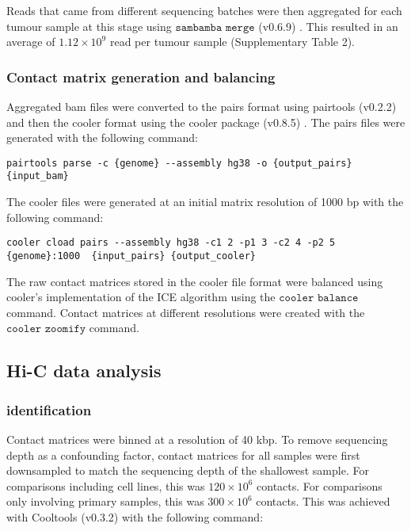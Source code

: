 Reads that came from different sequencing batches were then aggregated for each tumour sample at this stage using $\texttt{sambamba merge}$ (v0.6.9) \cite{tarasovSambambaFastProcessing2015}.
This resulted in an average of $1.12 \times 10^9$ read per tumour sample (Supplementary Table 2).

\subsubsection{Contact matrix generation and balancing}

Aggregated \gls{bam} files were converted to the pairs format using pairtools (v0.2.2) \cite{goloborodkoMirnylabPairtoolsV02019} and then the cooler format using the cooler package (v0.8.5) \cite{abdennurCoolerScalableStorage2020}.
The pairs files were generated with the following command:

\begin{lstlisting}[basicstyle=\ttfamily]
pairtools parse -c {genome} --assembly hg38 -o {output_pairs} {input_bam}
\end{lstlisting}

The cooler files were generated at an initial matrix resolution of 1000 bp with the following command:

\begin{lstlisting}[basicstyle=\ttfamily]
cooler cload pairs --assembly hg38 -c1 2 -p1 3 -c2 4 -p2 5 {genome}:1000  {input_pairs} {output_cooler}
\end{lstlisting}

The raw contact matrices stored in the cooler file format were balanced using cooler's implementation of the ICE algorithm \cite{imakaevIterativeCorrectionHiC2012} using the $\texttt{cooler balance}$ command.
Contact matrices at different resolutions were created with the $\texttt{cooler zoomify}$ command.

\subsection{Hi-C data analysis}

\subsubsection{ identification}

Contact matrices were binned at a resolution of 40 kbp.
To remove sequencing depth as a confounding factor, contact matrices for all samples were first downsampled to match the sequencing depth of the shallowest sample.
For comparisons including cell lines, this was $120 \times 10^6$ contacts.
For comparisons only involving primary samples, this was $300 \times 10^6$ contacts.
This was achieved with Cooltools (v0.3.2) \cite{venevMirnylabCooltoolsV02020} with the following command:


